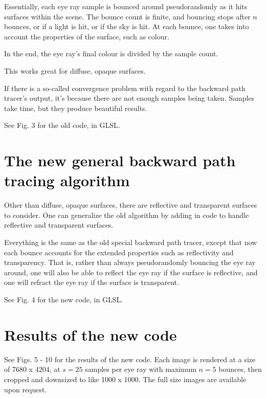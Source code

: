 \documentclass[12pt]{article}
\begin{document}
Essentially, each eye ray sample is bounced around pseudorandomly as it hits surfaces within the scene.
The bounce count is finite, and bouncing stops after $n$ bounces, or if a light is hit, or if the sky is hit.
At each bounce, one takes into account the properties of the surface, such as colour.

In the end, the eye ray's final colour is divided by the sample count.

This works great for diffuse, opaque surfaces.

If there is a so-called convergence problem with regard to the backward path tracer's output, it's because there are not enough samples being taken.
Samples take time, but they produce beautiful results.

See Fig. 3 for the old code, in GLSL.





\section{The new general backward path tracing algorithm}

Other than diffuse, opaque surfaces, there are reflective and transparent surfaces to consider.
One can generalize the old algorithm by adding in code to handle reflective and transparent surfaces.

Everything is the same as the old special backward path tracer, except that now each bounce accounts for the extended properties such as reflectivity and transparency.
That is, rather than always pseudorandomly bouncing the eye ray around, one will also be able to reflect the eye ray if the surface is reflective, and one will refract the eye ray if the surface is transparent.

See Fig. 4 for the new code, in GLSL.








\section{Results of the new code}

See Figs. 5 - 10 for the results of the new code.
Each image is rendered at a size of 7680 x 4204, at $s = 25$ samples per eye ray with maximum $n = 5$ bounces, then cropped and downsized to like 1000 x 1000.
The full size images are available upon request.
\end{document}
